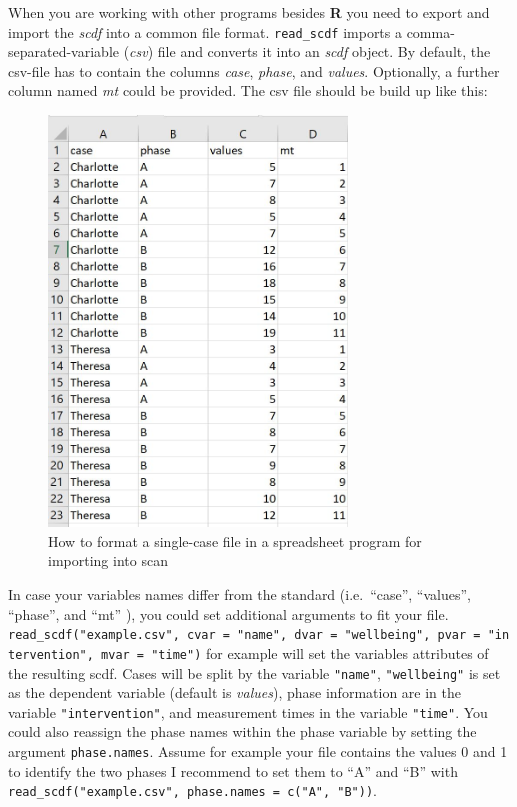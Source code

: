 \documentclass[
  letterpaper,
  DIV=11,
  numbers=noendperiod]{scrreprt}
\begin{document}
When you are working with other programs besides \textbf{R} you need to
export and import the \emph{scdf} into a common file format.
\texttt{read\_scdf} imports a comma-separated-variable (\emph{csv}) file
and converts it into an \emph{scdf} object. By default, the csv-file has
to contain the columns \emph{case}, \emph{phase}, and \emph{values}.
Optionally, a further column named \emph{mt} could be provided. The csv
file should be build up like this:

\begin{figure}

{\centering \includegraphics[width=3.125in,height=\textheight]{./images/readSC.jpg}

}

\caption{How to format a single-case file in a spreadsheet program for
importing into scan}

\end{figure}

In case your variables names differ from the standard (i.e.~``case'',
``values'', ``phase'', and ``mt'' ), you could set additional arguments
to fit your file.
\texttt{read\_scdf("example.csv",\ cvar\ =\ "name",\ dvar\ =\ "wellbeing",\ pvar\ =\ "intervention",\ mvar\ =\ "time")}
for example will set the variables attributes of the resulting scdf.
Cases will be split by the variable \texttt{"name"},
\texttt{"wellbeing"} is set as the dependent variable (default is
\emph{values}), phase information are in the variable
\texttt{"intervention"}, and measurement times in the variable
\texttt{"time"}. You could also reassign the phase names within the
phase variable by setting the argument \texttt{phase.names}. Assume for
example your file contains the values 0 and 1 to identify the two phases
I recommend to set them to ``A'' and ``B'' with
\texttt{read\_scdf("example.csv",\ phase.names\ =\ c("A",\ "B"))}.
\end{document}
